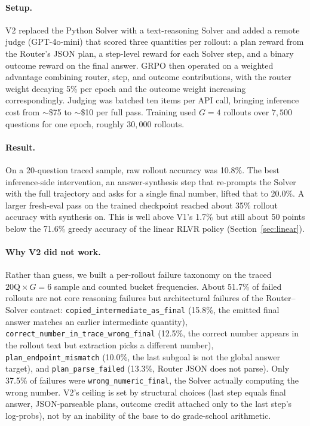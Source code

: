 \documentclass[11pt]{article}
\begin{document}
\paragraph{Setup.} V2 replaced the Python Solver with a text-reasoning Solver and added a remote judge (GPT-4o-mini) that scored three quantities per rollout: a plan reward from the Router's JSON plan, a step-level reward for each Solver step, and a binary outcome reward on the final answer. GRPO then operated on a weighted advantage combining router, step, and outcome contributions, with the router weight decaying 5\% per epoch and the outcome weight increasing correspondingly. Judging was batched ten items per API call, bringing inference cost from $\sim$\$75 to $\sim$\$10 per full pass. Training used $G{=}4$ rollouts over $7{,}500$ questions for one epoch, roughly $30{,}000$ rollouts.

\paragraph{Result.} On a 20-question traced sample, raw rollout accuracy was 10.8\%. The best inference-side intervention, an answer-synthesis step that re-prompts the Solver with the full trajectory and asks for a single final number, lifted that to 20.0\%. A larger fresh-eval pass on the trained checkpoint reached about 35\% rollout accuracy with synthesis on. This is well above V1's 1.7\% but still about 50 points below the 71.6\% greedy accuracy of the linear RLVR policy (Section~\ref{sec:linear}).

\paragraph{Why V2 did not work.} Rather than guess, we built a per-rollout failure taxonomy on the traced $20\mathrm{Q} \times G{=}6$ sample and counted bucket frequencies. About 51.7\% of failed rollouts are not core reasoning failures but architectural failures of the Router--Solver contract: \texttt{copied\_intermediate\_as\_final} (15.8\%, the emitted final answer matches an earlier intermediate quantity), \texttt{correct\_number\_in\_trace\_wrong\_final} (12.5\%, the correct number appears in the rollout text but extraction picks a different number), \texttt{plan\_endpoint\_mismatch} (10.0\%, the last subgoal is not the global answer target), and \texttt{plan\_parse\_failed} (13.3\%, Router JSON does not parse). Only 37.5\% of failures were \texttt{wrong\_numeric\_final}, the Solver actually computing the wrong number. V2's ceiling is set by structural choices (last step equals final answer, JSON-parseable plans, outcome credit attached only to the last step's log-probs), not by an inability of the base to do grade-school arithmetic.
\end{document}
